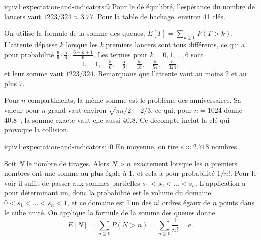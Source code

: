 \begin{solution}{iq:iv1:expectation-and-indicators:9}
Pour le dé équilibré, l'espérance du nombre de lancers vaut $1223/324 \approx 3.77$. Pour la table de hachage, environ 41 clés.

On utilise la formule de la somme des queues, $E[T] = \sum_{k \ge 0} P(T > k)$. L'attente dépasse $k$ lorsque les $k$ premiers lancers sont tous différents, ce qui a pour
probabilité $\frac{6}{6}\cdot\frac{5}{6}\cdots\frac{6-k+1}{6}$. Les termes pour $k = 0, 1, \dots, 6$ sont
\[
1,\quad 1,\quad \tfrac56,\quad \tfrac59,\quad \tfrac{5}{18},\quad \tfrac{5}{54},\quad \tfrac{5}{324},
\]
et leur somme vaut $1223/324$. Remarquons que l'attente vaut au moins 2 et au plus 7.

Pour $n$ compartiments, la même somme est le problème des anniversaires. Sa valeur pour $n$ grand vaut environ $\sqrt{\pi n/2} + 2/3$, ce qui, pour
$n = 1024$ donne $40.8$~; la somme exacte vaut elle aussi $40.8$. Ce décompte inclut la clé qui provoque la collision.

\end{solution}

\enlargethispage{-3\baselineskip}%
\begin{solution}{iq:iv1:expectation-and-indicators:10}
En moyenne, on tire $e \approx 2.718$ nombres.

Soit $N$ le nombre de tirages. Alors $N > n$ exactement lorsque les $n$ premiers nombres ont une somme au plus égale à 1, et cela a pour probabilité $1/n!$. Pour le voir
il suffit de passer aux sommes partielles $s_1 < s_2 < \dots < s_n$. L'application a pour déterminant un, donc la probabilité est le volume du
domaine $0 < s_1 < \dots < s_n < 1$, et ce domaine est l'un des $n!$ ordres égaux de $n$ points dans le cube unité. On applique la
formule de la somme des queues donne
\[
E[N] = \sum_{n \ge 0} P(N > n) = \sum_{n \ge 0} \frac{1}{n!} = e.
\]
\end{solution}

